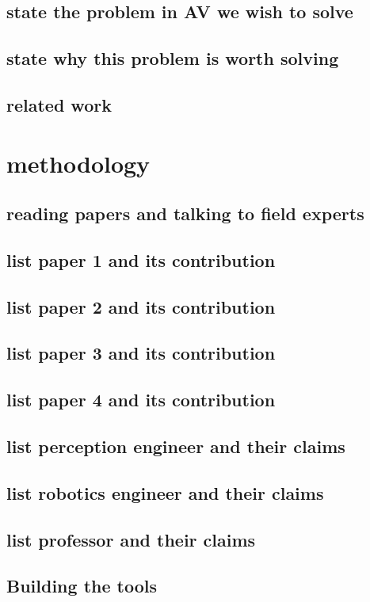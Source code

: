 \documentclass[conference]{IEEEtran}
\begin{document}
\subsection{state the problem in AV we wish to solve}
\subsection{state why this problem is worth solving}
\subsection{related work}

\section{methodology}
\subsection{reading papers and talking to field experts}
\subsection{list paper 1 and its contribution}
\subsection{list paper 2 and its contribution}
\subsection{list paper 3 and its contribution}
\subsection{list paper 4 and its contribution}
\subsection{list perception engineer and their claims}
\subsection{list robotics engineer and their claims}
\subsection{list professor and their claims}
\subsection{Building the tools}
\end{document}
